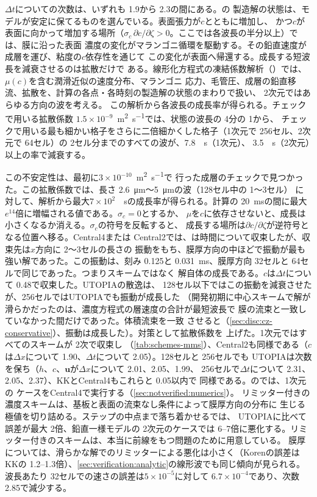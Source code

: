 $\Delta t$についての次数は、いずれも 1.9から 2.3の間にある。の
製造解の状態は、モデルが安定に保てるものを選んでいる。表面張力が$c$とともに増加し、
かつ$c$が表面に向かって増加する場所（$\sigma_c\,\partial
c/\partial\zeta > 0$。ここでは各波長の半分以上）では、膜に沿った表面
濃度の変化がマランゴニ循環を駆動する。その鉛直速度が成層を運び、粘度の$c$依存性を通じて
この変化が表面へ帰還する。成長する短波長を減衰させるのは拡散だけで
ある。線形化方程式の凍結係数解析（）では、$\mu(c)$を含む潤滑近似の速度分布、マランゴニ
応力、毛管圧、成層の鉛直移流、拡散を、計算の各点・各時刻の製造解の状態のまわりで扱い、
2次元ではあらゆる方向の波を考える。
この解析から各波長の成長率が得られる。チェックで用いる拡散係数
$1.5\times10^{-9}$~\si{\metre\squared\per\second}では、状態の波長の 4分の 1から、
チェックで用いる最も細かい格子をさらに二倍細かくした格子（1次元で 256セル、2次元で 64セル）の
2セル分までのすべての波が、\SI{7.8}{\per\second}（1次元）、
\SI{3.5}{\per\second}（2次元）以上の率で減衰する。

この不安定性は、最初に$3\times10^{-10}$~\si{\metre\squared\per\second}で
行った成層のチェックで見つかった。この拡散係数では、長さ
\SI{2.6}{\micro\metre}～\SI{5}{\micro\metre}の波（128セル中の 1～3セル）
に対して、解析から最大$7\times10^{2}$~\si{\per\second}の成長率が得られる。計算の
\SI{20}{\milli\second}の間に最大$e^{14}$倍に増幅される値である。$\sigma_c = 0$とするか、
$\mu$を$c$に依存させないと、成長は小さくなるか消える。$\sigma_c$の符号を反転すると、
成長する場所は$\partial c/\partial\zeta$が逆符号となる位置へ移る。Central4または
Central2では、は時間について収束したが、収束先は$x$方向に 2～3セルの長さの
振動をもち、膜厚方向の中ほどで振動が最も強い解であった。この振動は、刻み 0.125と
\SI{0.031}{\milli\second}、膜厚方向 32セルと 64セルで同じであった。つまりスキームではなく
解自体の成長である。$c$は$\Delta t$について 0.48で収束した。UTOPIAの散逸は、
128セル以下ではこの振動を減衰させたが、256セルではUTOPIAでも振動が成長した
（開発初期に中心スキームで解が滑らかだったのは、濃度方程式の層速度の合計が最短波長で
膜の流束と一致していなかった間だけであった。体積流束を一致
させると（\cref{sec:disc:cz-conservative}）、振動は成長した）。対策として拡散係数を
上げた。1次元ではすべてのスキームが 2次で収束し
（\cref{tab:schemes-mms}）、Central2も同様である（$c$は$\Delta x$について 1.90、$\Delta t$について 2.05）。128セルと 256セルでも
UTOPIAは次数を保ち（$h$、$c$、$\mathbf u$が$\Delta x$について 2.01、2.05、1.99、
256セルで$\Delta t$について 2.31、2.05、2.37）、KKとCentral4もこれらと 0.05以内で
同様である。のでは、1次元の
ケースをCentral4で実行する（\cref{sec:notverified:numerics}）。
リミッター付きの濃度スキームは、基板と表面の流束なし条件によって膜厚方向の分布に
生じる極値を切り詰める。ステップの中点まで落ち着かせるでは、
UTOPIAに比べて誤差が最大 2倍、鉛直一様モデルの 2次元のケースでは
6--7倍に悪化する。リミッター付きのスキームは、本当に前線をもつ問題のために用意している。
膜厚については、滑らかな解でのリミッターによる悪化は小さく（Korenの誤差はKKの
1.2--1.3倍）、\cref{sec:verification:analytic}の線形波でも同じ傾向が見られる。
波長あたり 32セルでの速さの誤差は$5\times10^{-5}$に対して
$6.7\times10^{-4}$であり、次数 2.85で減少する。

